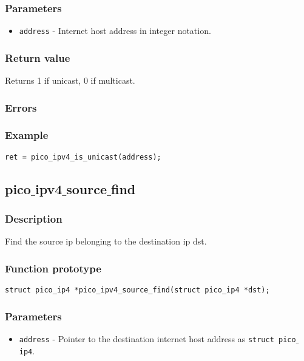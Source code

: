 \subsubsection*{Parameters}
\begin{itemize}
\item \texttt{address} - Internet host address in integer notation.
\end{itemize}

\subsubsection*{Return value}
Returns 1 if unicast, 0 if multicast.

\subsubsection*{Errors}

\subsubsection*{Example}
\begin{verbatim}
ret = pico_ipv4_is_unicast(address);
\end{verbatim}


\subsection{pico$\_$ipv4$\_$source$\_$find}

\subsubsection*{Description}
Find the source ip belonging to the destination ip dst.

\subsubsection*{Function prototype}
\begin{verbatim}
struct pico_ip4 *pico_ipv4_source_find(struct pico_ip4 *dst);
\end{verbatim}

\subsubsection*{Parameters}
\begin{itemize}
\item \texttt{address} - Pointer to the destination internet host address as \texttt{struct pico$\_$ip4}.
\end{itemize}

